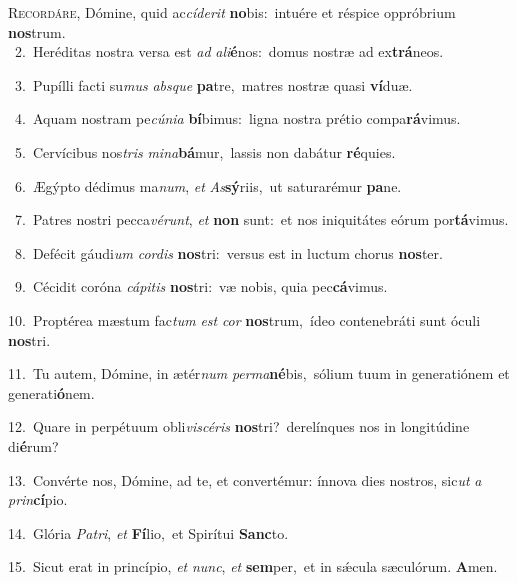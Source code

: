 \lettrine{\initial\textcolor{\initialcolor}{R}}{ecordáre,} Dómine, quid ac\-\textit{cí}\-\textit{de}\textit{rit} \textbf{no}\-bis:~\star intuére et réspice oppróbrium \textbf{nos}\-trum.\\
{\numbfont\textcolor{\numbcolor}{~2.}}~Heréditas nostra versa est \textit{ad} \textit{a}\-\textit{li}\textbf{é}nos:~\star domus nostræ ad ex\-\textbf{trá}\-neos.\par
{\numbfont\textcolor{\numbcolor}{~3.}}~Pupílli facti su\textit{mus} \textit{abs}\-\textit{que} \textbf{pa}\-tre,~\star matres nostræ quasi \textbf{ví}\-duæ.\par
{\numbfont\textcolor{\numbcolor}{~4.}}~Aquam nostram pe\-\textit{cú}\-\textit{ni}\textit{a} \textbf{bí}\-bimus:~\star ligna nostra prétio compa\-\textbf{rá}\-vimus.\par
{\numbfont\textcolor{\numbcolor}{~5.}}~Cervícibus nos\textit{tris} \textit{mi}\-\textit{na}\textbf{bá}mur,~\star lassis non dabátur \textbf{ré}\-quies.\par
{\numbfont\textcolor{\numbcolor}{~6.}}~Ægýpto dédimus ma\-\textit{num}\-, \textit{et} \textit{As}\-\textbf{sý}riis,~\star ut saturarémur \textbf{pa}\-ne.\par
{\numbfont\textcolor{\numbcolor}{~7.}}~Patres nostri pecca\-\textit{vé}\-\textit{runt}, \textit{et} \textbf{non} sunt:~\star et nos iniquitátes eórum por\-\textbf{tá}\-vimus.\par
{\numbfont\textcolor{\numbcolor}{~8.}}~Defécit gáudi\textit{um} \textit{cor}\-\textit{dis} \textbf{nos}\-tri:~\star versus est in luctum chorus \textbf{nos}\-ter.\par
{\numbfont\textcolor{\numbcolor}{~9.}}~Cécidit coróna \textit{cá}\-\textit{pi}\textit{tis} \textbf{nos}\-tri:~\star væ nobis, quia pec\-\textbf{cá}\-vimus.\par
{\numbfont\textcolor{\numbcolor}{10.}}~Proptérea mæstum fac\textit{tum} \textit{est} \textit{cor} \textbf{nos}\-trum,~\star ídeo contenebráti sunt óculi \textbf{nos}\-tri.\par
{\numbfont\textcolor{\numbcolor}{11.}}~Tu autem, Dómine, in ætér\textit{num} \textit{per}\-\textit{ma}\textbf{né}bis,~\star sólium tuum in generatiónem et generati\-\textbf{ó}\-nem.\par
{\numbfont\textcolor{\numbcolor}{12.}}~Quare in perpétuum obli\-\textit{vi}\-\textit{scé}\textit{ris} \textbf{nos}\-tri?~\star derelínques nos in longitúdine di\-\textbf{é}\-rum?\par
{\numbfont\textcolor{\numbcolor}{13.}}~Convérte nos, Dómine, ad te, et convertémur: ínnova dies nostros, sic\textit{ut} \textit{a} \textit{prin}\-\textbf{cí}pio.\par
{\numbfont\textcolor{\numbcolor}{14.}}~Glória \textit{Pa}\-\textit{tri}, \textit{et} \textbf{Fí}\-lio,~\star et Spirítui \textbf{Sanc}\-to.\par
{\numbfont\textcolor{\numbcolor}{15.}}~Sicut erat in princípio, \textit{et} \textit{nunc}\-, \textit{et} \textbf{sem}\-per,~\star et in sǽcula sæculórum. \textbf{A}\-men.\par
